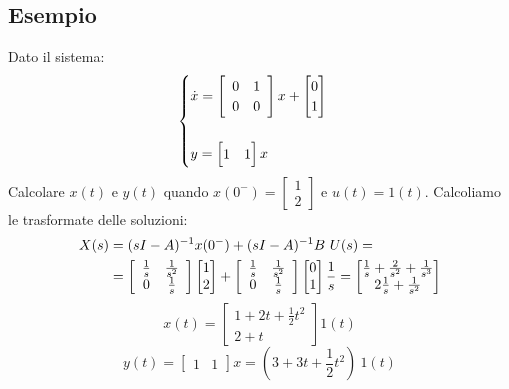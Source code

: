 \documentclass[../main.tex]{subfiles}
\begin{document}
	\subsection*{Esempio}
		Dato il sistema:
		\[\begin{cases}
			\dot x = \matTwo{0}{1}{0}{0} x + \left[ \begin{matrix} 0\\1 \end{matrix} \right]\\
			\smallskip\\
			y = \left[ \begin{matrix} 1 &1 \end{matrix} \right] x
		\end{cases} \]
		Calcolare $ x(t) $ e $ y(t) $ quando $ x(0^-) = \left[ \begin{matrix} 1\\ 2 \end{matrix} \right] $ e $ u(t) = 1(t) $.
		Calcoliamo le trasformate delle soluzioni:
		\begin{align*}
			X(s) &= (sI-A)^{-1} x(0^-) + (sI-A)^{-1} B\ U(s) =\\
			&= \left[ \begin{array}{cc} \frac{1}{s} & \frac{1}{s^2}\\ 0 & \frac{1}{s} \end{array} \right] \left[ \begin{matrix} 1\\ 2 \end{matrix} \right] + \left[ \begin{array}{cc} \frac{1}{s} & \frac{1}{s^2}\\ 0 & \frac{1}{s} \end{array} \right] \left[ \begin{matrix} 0\\1 \end{matrix} \right] \frac{1}{s} = \left[ \begin{matrix} \frac{1}{s}+\frac{2}{s^2}+\frac{1}{s^3}\\ 2\frac{1}{s}+\frac{1}{s^2} \end{matrix} \right] 
		\end{align*}
		\[ x(t) = \left[ \begin{matrix} 1+2t+\frac{1}{2}t^2\\ 2+t \end{matrix} \right] 1(t) \]
		\[ y(t) = \left[ \begin{matrix} 1 &1 \end{matrix} \right] x = (3+3t+\frac{1}{2}t^2)\ 1(t) \]
\end{document}
